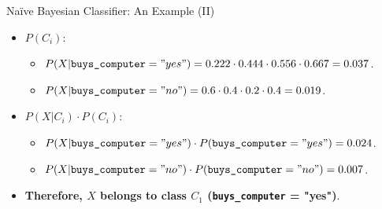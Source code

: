 \begin{frame}{Naïve Bayesian Classifier: An Example (II)}
	\begin{itemize}
		\item $P(C_i)$:
		      \begin{itemize}
			      \item $P(X | \texttt{buys\_computer} = "yes") = 0.222 \cdot 0.444 \cdot 0.556 \cdot 0.667 = 0.037$.
			      \item $P(X | \texttt{buys\_computer} = "no") = 0.6 \cdot 0.4 \cdot 0.2 \cdot 0.4 = 0.019$.
		      \end{itemize}
		\item $P(X | C_i) \cdot P(C_i)$:
		      \begin{itemize}
			      \item $P(X | \texttt{buys\_computer} = "yes") \cdot  P(\texttt{buys\_computer} = "yes") = 0.024$.
			      \item $P(X | \texttt{buys\_computer} = "no") \cdot  P(\texttt{buys\_computer} = "no") = 0.007$.
		      \end{itemize}
		\item \textbf{Therefore, $X$ belongs to class $C_1$ (\texttt{buys\_computer} = "yes")}.
	\end{itemize}
\end{frame}

